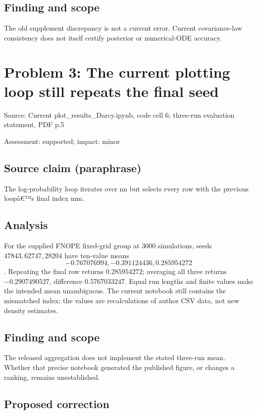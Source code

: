 \documentclass[11pt]{article}
\begin{document}
\subsection*{Finding and scope}

The old supplement discrepancy is not a current error. Current covariance-law consistency does not itself certify posterior or numerical-ODE accuracy.

\section*{Problem 3: The current plotting loop still repeats the final seed}

Source: Current plot\_results\_Darcy.ipynb, code cell 6; three-run evaluation statement, PDF p.5

Assessment: supported; impact: minor

\subsection*{Source claim (paraphrase)}

The log-probability loop iterates over nn but selects every row with the previous loopâ€™s final index mm.

\subsection*{Analysis}

For the supplied FNOPE fixed-grid group at \(3000\) simulations, seeds \(47843,62747,28204\) have ten-value means \[-0.767076994,-0.391124436,0.285954272\]. Repeating the final row returns \(0.285954272\); averaging all three returns \(-0.2907490527\), difference \(0.5767033247\). Equal run lengths and finite values make the intended mean unambiguous. The current notebook still contains the mismatched index; the values are recalculations of author CSV data, not new density estimates.

\subsection*{Finding and scope}

The released aggregation does not implement the stated three-run mean. Whether that precise notebook generated the published figure, or changes a ranking, remains unestablished.

\subsection*{Proposed correction}
\end{document}
